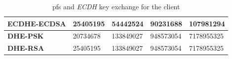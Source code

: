 \documentclass{llncs}
\begin{document}
\begin{table}[]
\begin{tabular}{|l|l|l|l|l|}
\textbf{ECDHE-ECDSA}                       & 25405195                        & 54442524                        & 90231688                        & 107981294                        \\ \hline
\textbf{DHE-PSK}                           & 20734678                        & 133849027                       & 948573054                        & 7178955325                        \\ \hline
\textbf{DHE-RSA}                           & 25405195                        & 133849027                        & 948573054                        & 7178955325                        \\ \hline
\end{tabular}
\caption{\label{table:pfs-cost-client} \gls{pfs} and \textit{ECDH} key exchange for the client}
\end{table}
\end{document}
